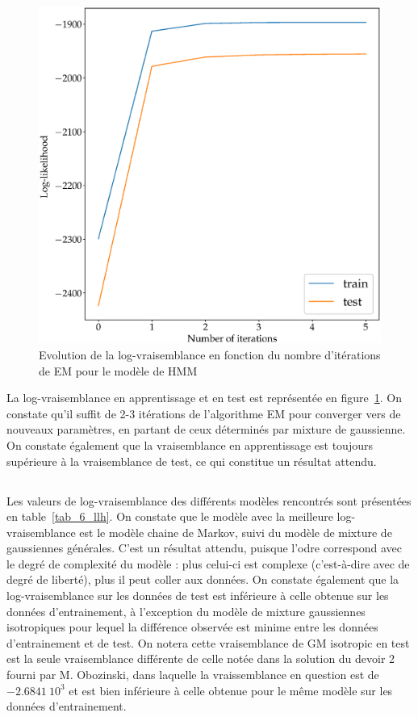 \documentclass[12pt,a4paper,onecolumn]{article}
\begin{document}
\begin{figure}[H]
	\centering
	\includegraphics[width = 1.0\textwidth]{5_em_llh}
	\caption{Evolution de la log-vraisemblance en fonction du nombre d'itérations de EM pour le modèle de HMM}
	\label{fig_5_llh_em}
\end{figure}

La log-vraisemblance en apprentissage et en test est représentée en figure~\ref{fig_5_llh_em}. On constate qu'il suffit de 2-3 itérations de l'algorithme EM pour converger vers de nouveaux paramètres, en partant de ceux déterminés par mixture de gaussienne. On constate également que la vraisemblance en apprentissage est toujours supérieure à la vraisemblance de test, ce qui constitue un résultat attendu.

\subsection{}

Les valeurs de log-vraisemblance des différents modèles rencontrés sont présentées en table~\ref{tab_6_llh}. On constate que le modèle avec la meilleure log-vraisemblance est le modèle chaine de Markov, suivi du modèle de mixture de gaussiennes générales. C'est un résultat attendu, puisque l'odre correspond avec le degré de complexité du modèle : plus celui-ci est complexe (c'est-à-dire avec de degré de liberté), plus il peut coller aux données. On constate également que la log-vraisemblance sur les données de test est inférieure à celle obtenue sur les données d'entrainement, à l'exception du modèle de mixture gaussiennes isotropiques pour lequel la différence observée est minime entre les données d'entrainement et de test. On notera cette vraisemblance de GM isotropic en test est la seule vraisemblance différente de celle notée dans la solution du devoir 2 fourni par M. Obozinski, dans laquelle la vraissemblance en question est de \(-2.6841~10^3\) et est bien  inférieure à celle obtenue pour le même modèle sur les données d'entrainement.
\end{document}
